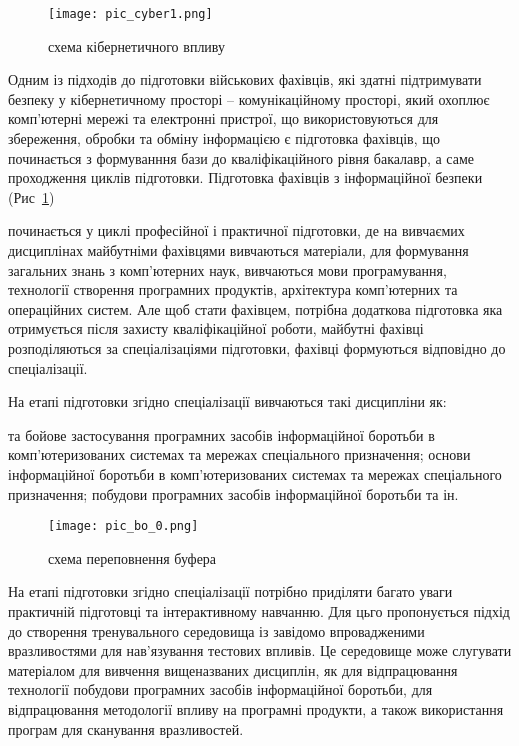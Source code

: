 \begin{figure}[h]
    \centering
    \texttt{[image: pic\_cyber1.png]}
    \caption{схема кібернетичного впливу}
    \label{fig:cyber_attack}
\end{figure}

Одним із підходів до підготовки військових фахівців, які здатні підтримувати безпеку у кібернетичному просторі – комунікаційному просторі, який охоплює комп’ютерні мережі та електронні пристрої, що використовуються для збереження, обробки та обміну інформацією є підготовка фахівців, що починається з формуванння бази до кваліфікаційного рівня бакалавр, а саме проходження циклів підготовки.
Підготовка фахівців з інформаційної безпеки (Рис \,\ref{fig:cyber_attack})

починається у циклі професійної і практичної підготовки, де на вивчаємих дисциплінах майбутніми фахівцями вивчаються матеріали, для формування загальних знань з комп’ютерних наук, вивчаються мови програмування, технології створення програмних продуктів, архітектура комп’ютерних та операційних  систем. Але щоб стати фахівцем, потрібна додаткова підготовка яка отримується після захисту кваліфікаційної роботи, майбутні фахівці розподіляються за спеціалізаціями підготовки, фахівці формуються відповідно до спеціалізації.

На етапі підготовки згідно спеціалізації вивчаються такі дисципліни як:
\begin{itemize}
 та бойове застосування програмних засобів інформаційної боротьби в комп’ютеризованих системах та мережах спеціального призначення;
 основи інформаційної боротьби в комп’ютеризованих системах та мережах спеціального призначення;
 побудови програмних засобів інформаційної боротьби та ін.
\end{itemize}


\begin{figure}[h]
    \centering
    \texttt{[image: pic\_bo\_0.png]}
    \caption{схема переповнення буфера}
    \label{fig:buffer_overflow}
\end{figure}

На етапі підготовки згідно спеціалізації потрібно приділяти багато уваги практичній підготовці та інтерактивному навчанню. Для цьго пропонується підхід до створення тренувального середовища із завідомо впровадженими вразливостями для нав’язування тестових впливів. Це середовище може слугувати матеріалом для вивчення вищеназваних дисциплін, як для відпрацювання технології побудови програмних засобів інформаційної боротьби,  для відпрацювання методології впливу на програмні продукти, а також використання програм для сканування вразливостей.

